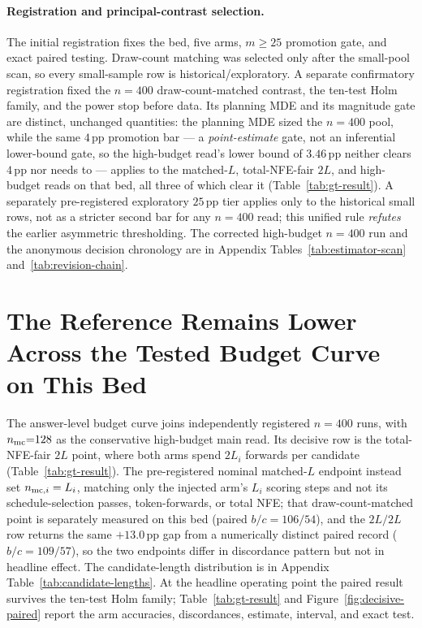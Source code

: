 \documentclass{article}
\newcommand{\pp}{\,\mathrm{pp}}
\begin{document}
\paragraph{Registration and principal-contrast selection.}
The initial registration fixes the bed, five arms, $m{\geq}25$ promotion gate,
and exact paired testing.  Draw-count matching was selected only after the
small-pool scan, so every small-sample row is historical/exploratory.  A
separate confirmatory registration fixed the $n=400$ draw-count-matched
contrast, the ten-test Holm family, and the power stop before data.  Its
planning MDE and its magnitude gate are distinct, unchanged quantities: the
planning MDE sized the $n=400$ pool, while the same $4\pp$ promotion bar --- a
\emph{point-estimate} gate, not an inferential lower-bound gate, so the
high-budget read's lower bound of $3.46\pp$ neither clears $4\pp$ nor needs to
--- applies to the matched-$L$, total-NFE-fair $2L$, and high-budget reads on
that bed, all three of which clear it (Table~\ref{tab:gt-result}).  A
separately pre-registered exploratory $25\pp$ tier applies only to the
historical small rows, not as a stricter second bar for any $n=400$ read; this
unified rule \emph{refutes} the earlier asymmetric thresholding.  The corrected
high-budget $n=400$ run and the anonymous decision chronology are in Appendix
Tables~\ref{tab:estimator-scan} and~\ref{tab:revision-chain}.
\section{The Reference Remains Lower Across the Tested Budget Curve on This Bed}
\label{sec:result1}

The answer-level budget curve joins independently registered $n=400$ runs, with
$n_{\rm mc}{=}128$ as the conservative high-budget main read.  Its decisive row
is the total-NFE-fair $2L$ point, where both arms spend $2L_i$ forwards per
candidate (Table~\ref{tab:gt-result}).  The pre-registered nominal matched-$L$
endpoint instead set $n_{{\rm mc},i}=L_i$, matching only the injected arm's
$L_i$ scoring steps and not its schedule-selection passes, token-forwards, or
total NFE; that draw-count-matched point is separately measured on this bed
(paired $b/c=106/54$), and the $2L/2L$ row returns the same $+13.0\pp$ gap from
a numerically distinct paired record ($b/c=109/57$), so the two endpoints differ
in discordance pattern but not in headline effect.  The candidate-length
distribution is in Appendix Table~\ref{tab:candidate-lengths}.  At
the headline operating point the paired result survives the ten-test Holm
family; Table~\ref{tab:gt-result} and Figure~\ref{fig:decisive-paired} report
the arm accuracies, discordances, estimate, interval, and exact test.
\end{document}
